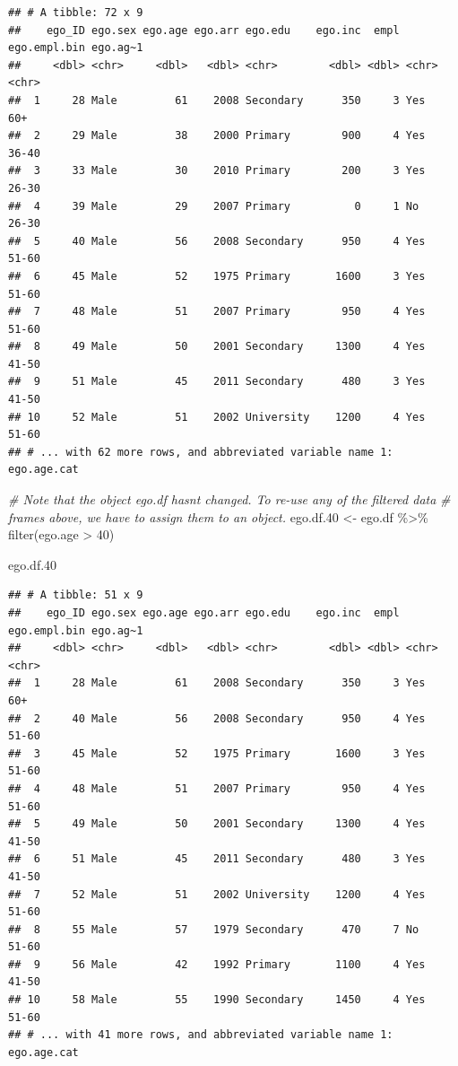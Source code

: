 \documentclass[
]{book}
\newenvironment{Shaded}{\begin{snugshade}}{\end{snugshade}}
\newcommand{\CommentTok}[1]{\textcolor[rgb]{0.56,0.35,0.01}{\textit{#1}}}
\newcommand{\DecValTok}[1]{\textcolor[rgb]{0.00,0.00,0.81}{#1}}
\newcommand{\FloatTok}[1]{\textcolor[rgb]{0.00,0.00,0.81}{#1}}
\newcommand{\FunctionTok}[1]{\textcolor[rgb]{0.00,0.00,0.00}{#1}}
\newcommand{\NormalTok}[1]{#1}
\newcommand{\OtherTok}[1]{\textcolor[rgb]{0.56,0.35,0.01}{#1}}
\newcommand{\SpecialCharTok}[1]{\textcolor[rgb]{0.00,0.00,0.00}{#1}}
\begin{document}
\begin{verbatim}
## # A tibble: 72 x 9
##    ego_ID ego.sex ego.age ego.arr ego.edu    ego.inc  empl ego.empl.bin ego.ag~1
##     <dbl> <chr>     <dbl>   <dbl> <chr>        <dbl> <dbl> <chr>        <chr>   
##  1     28 Male         61    2008 Secondary      350     3 Yes          60+     
##  2     29 Male         38    2000 Primary        900     4 Yes          36-40   
##  3     33 Male         30    2010 Primary        200     3 Yes          26-30   
##  4     39 Male         29    2007 Primary          0     1 No           26-30   
##  5     40 Male         56    2008 Secondary      950     4 Yes          51-60   
##  6     45 Male         52    1975 Primary       1600     3 Yes          51-60   
##  7     48 Male         51    2007 Primary        950     4 Yes          51-60   
##  8     49 Male         50    2001 Secondary     1300     4 Yes          41-50   
##  9     51 Male         45    2011 Secondary      480     3 Yes          41-50   
## 10     52 Male         51    2002 University    1200     4 Yes          51-60   
## # ... with 62 more rows, and abbreviated variable name 1: ego.age.cat
\end{verbatim}

\begin{Shaded}
\begin{Highlighting}[]
\CommentTok{\# Note that the object ego.df hasn\textquotesingle{}t changed. To re{-}use any of the filtered data}
\CommentTok{\# frames above, we have to assign them to an object.}
\NormalTok{ego.df}\FloatTok{.40} \OtherTok{\textless{}{-}}\NormalTok{ ego.df }\SpecialCharTok{\%\textgreater{}\%}
  \FunctionTok{filter}\NormalTok{(ego.age }\SpecialCharTok{\textgreater{}} \DecValTok{40}\NormalTok{)}

\NormalTok{ego.df}\FloatTok{.40}
\end{Highlighting}
\end{Shaded}

\begin{verbatim}
## # A tibble: 51 x 9
##    ego_ID ego.sex ego.age ego.arr ego.edu    ego.inc  empl ego.empl.bin ego.ag~1
##     <dbl> <chr>     <dbl>   <dbl> <chr>        <dbl> <dbl> <chr>        <chr>   
##  1     28 Male         61    2008 Secondary      350     3 Yes          60+     
##  2     40 Male         56    2008 Secondary      950     4 Yes          51-60   
##  3     45 Male         52    1975 Primary       1600     3 Yes          51-60   
##  4     48 Male         51    2007 Primary        950     4 Yes          51-60   
##  5     49 Male         50    2001 Secondary     1300     4 Yes          41-50   
##  6     51 Male         45    2011 Secondary      480     3 Yes          41-50   
##  7     52 Male         51    2002 University    1200     4 Yes          51-60   
##  8     55 Male         57    1979 Secondary      470     7 No           51-60   
##  9     56 Male         42    1992 Primary       1100     4 Yes          41-50   
## 10     58 Male         55    1990 Secondary     1450     4 Yes          51-60   
## # ... with 41 more rows, and abbreviated variable name 1: ego.age.cat
\end{verbatim}
\end{document}
